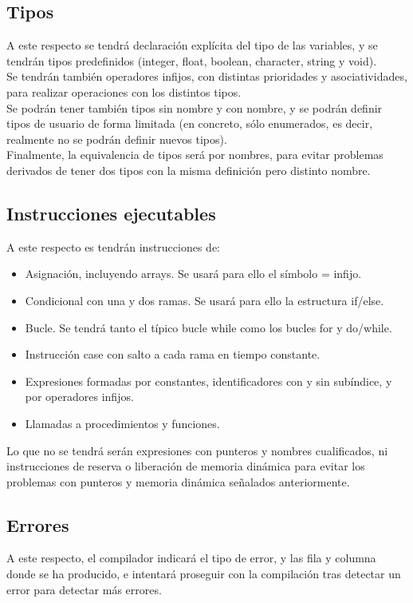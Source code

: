 \documentclass[a4paper, 12pt]{article}
\begin{document}
\subsection{Tipos}
A este respecto se tendrá declaración explícita del tipo de las variables, y se tendrán tipos predefinidos (integer, float, boolean, character, string y void).\\

Se tendrán también operadores infijos, con distintas prioridades y asociatividades, para realizar operaciones con los distintos tipos.\\

Se podrán tener también tipos sin nombre y con nombre, y se podrán definir tipos de usuario de forma limitada (en concreto, sólo enumerados, es decir, realmente no se podrán definir nuevos tipos).\\

Finalmente, la equivalencia de tipos será por nombres, para evitar problemas derivados de tener dos tipos con la misma definición pero distinto nombre.
\newpage

\subsection{Instrucciones ejecutables}
A este respecto es tendrán instrucciones de:
\begin{itemize}
\item Asignación, incluyendo arrays. Se usará para ello el símbolo = infijo.
\item Condicional con una y dos ramas. Se usará para ello la estructura if/else.
\item Bucle. Se tendrá tanto el típico bucle while como los bucles for y do/while.
\item Instrucción case con salto a cada rama en tiempo constante.
\item Expresiones formadas por constantes, identificadores con y sin subíndice, y por operadores infijos.
\item Llamadas a procedimientos y funciones.
\end{itemize}
Lo que no se tendrá serán expresiones con punteros y nombres cualificados, ni instrucciones de reserva o liberación de memoria dinámica para evitar los problemas con punteros y memoria dinámica señalados anteriormente.
\subsection{Errores}
A este respecto, el compilador indicará el tipo de error, y las fila y columna donde se ha producido, e intentará proseguir con la compilación tras detectar un error para detectar más errores.
\newpage
\end{document}
